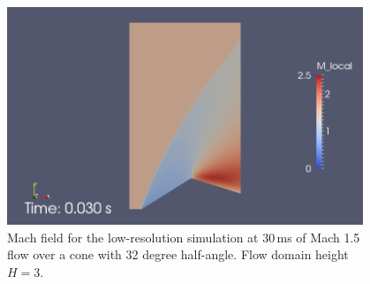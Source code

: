 \begin{figure}[htbp]
\begin{center}
\includegraphics[width=0.95\textwidth]{../2D/cone20-parametric/conepe-M1p5-32degree-H-3p0-M-field-30ms.png}
\end{center}
\caption{Mach field for the low-resolution simulation at 30\,ms
         of Mach 1.5 flow over a cone with 32 degree half-angle.
         Flow domain height $H=3$.}
\label{conep-32-degrees-H-3-M-field-30ms-fig}
\end{figure}
